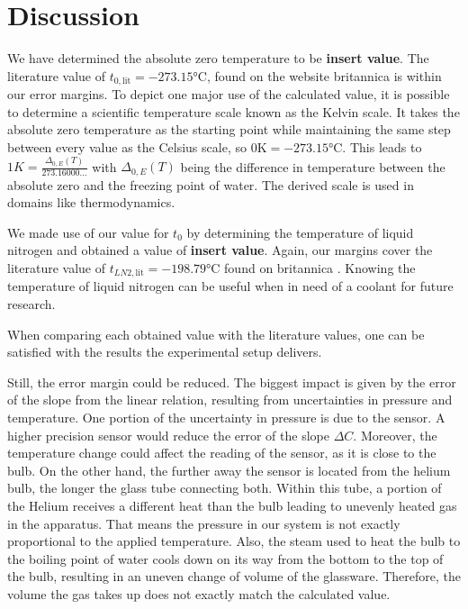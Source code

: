 \section{Discussion}
    We have determined the absolute zero temperature to be \textbf{insert value}.
    The literature value of $t_{0, \text{lit}} = -273.15 \si{\celsius}$, found on the website britannica \cite{literature_absolute_zero} is within our error margins.
    To depict one major use of the calculated value, it is possible to determine a scientific temperature scale known as the Kelvin scale.
    It takes the absolute zero temperature as the starting point while maintaining the same step between every value as the Celsius scale, so $0 \si{\kelvin} = -273.15 \si{\celsius}$.
    This leads to $1K = \frac{\Delta_{0, E}(T)}{273.16000...}$ with $\Delta_{0, E}(T)$ being the difference in temperature between the absolute zero and the freezing point of water.
    The derived scale is used in domains like thermodynamics.

    We made use of our value for $t_0$ by determining the temperature of liquid nitrogen and obtained a value of \textbf{insert value}.
    Again, our margins cover the literature value of $t_{LN2, \text{lit}} = -198.79 \si{\celsius}$ found on britannica \cite{literature_liquid_nitrogen}.
    Knowing the temperature of liquid nitrogen can be useful when in need of a coolant for future research.

    When comparing each obtained value with the literature values, one can be satisfied with the results the experimental setup delivers.

    Still, the error margin could be reduced.
    The biggest impact is given by the error of the slope from the linear relation, resulting from uncertainties in pressure and temperature.
    One portion of the uncertainty in pressure is due to the sensor.
    A higher precision sensor would reduce the error of the slope $\Delta C$.
    Moreover, the temperature change could affect the reading of the sensor, as it is close to the bulb.
    On the other hand, the further away the sensor is located from the helium bulb, the longer the glass tube connecting both.
    Within this tube, a portion of the Helium receives a different heat than the bulb leading to unevenly heated gas in the apparatus.
    That means the pressure in our system is not exactly proportional to the applied temperature.
    Also, the steam used to heat the bulb to the boiling point of water cools down on its way from the bottom to the top of the bulb, resulting in an uneven change of volume of the glassware.
    Therefore, the volume the gas takes up does not exactly match the calculated value.

